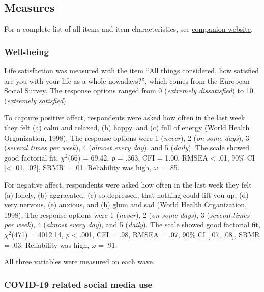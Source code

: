 \documentclass[
  man,mask,floatsintext]{apa7}
\begin{document}
\hypertarget{measures}{%
\subsection{Measures}\label{measures}}

For a complete list of all items and item characteristics, see \href{https://XMtRA.github.io/Austrian_Corona_Panel_Project}{companion website}.

\hypertarget{well-being}{%
\subsubsection{Well-being}\label{well-being}}

Life satisfaction was measured with the item ``All things considered, how satisfied are you with your life as a whole nowadays?'', which comes from the European Social Survey.
The response options ranged from 0 (\emph{extremely dissatisfied}) to 10 (\emph{extremely satisfied}).

To capture positive affect, respondents were asked how often in the last week they felt (a) calm and relaxed, (b) happy, and (c) full of energy (World Health Organization, 1998).
The response options were 1 (\emph{never}), 2 (\emph{on some days}), 3 (\emph{several times per week}), 4 (\emph{almost every day}), and 5 (\emph{daily}).
The scale showed good factorial fit, \(\chi^2\)(66) = 69.42, \emph{p} = .363, CFI = 1.00, RMSEA \textless{} .01, 90\% CI {[}\textless{} .01, .02{]}, SRMR = .01.
Reliability was high, \(\omega\) = .85.

For negative affect, respondents were asked how often in the last week they felt (a) lonely, (b) aggravated, (c) so depressed, that nothing could lift you up, (d) very nervous, (e) anxious, and (h) glum and sad (World Health Organization, 1998).
The response options were 1 (\emph{never}), 2 (\emph{on some days}), 3 (\emph{several times per week}), 4 (\emph{almost every day}), and 5 (\emph{daily}).
The scale showed good factorial fit, \(\chi^2\)(471) = 4012.14, \emph{p} \textless{} .001, CFI = .98, RMSEA = .07, 90\% CI {[}.07, .08{]}, SRMR = .03.
Reliability was high, \(\omega\) = .91.

All three variables were measured on each wave.

\hypertarget{covid-19-related-social-media-use}{%
\subsubsection{COVID-19 related social media use}\label{covid-19-related-social-media-use}}
\end{document}
